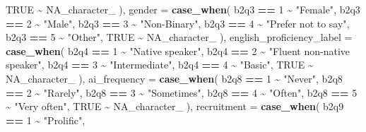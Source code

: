 \documentclass[
]{article}
\newenvironment{Shaded}{\begin{snugshade}}{\end{snugshade}}
\newcommand{\AttributeTok}[1]{\textcolor[rgb]{0.13,0.29,0.53}{#1}}
\newcommand{\ConstantTok}[1]{\textcolor[rgb]{0.56,0.35,0.01}{#1}}
\newcommand{\DecValTok}[1]{\textcolor[rgb]{0.00,0.00,0.81}{#1}}
\newcommand{\FunctionTok}[1]{\textcolor[rgb]{0.13,0.29,0.53}{\textbf{#1}}}
\newcommand{\NormalTok}[1]{#1}
\newcommand{\SpecialCharTok}[1]{\textcolor[rgb]{0.81,0.36,0.00}{\textbf{#1}}}
\newcommand{\StringTok}[1]{\textcolor[rgb]{0.31,0.60,0.02}{#1}}
\begin{document}
\begin{Shaded}
\begin{Highlighting}[]
      \ConstantTok{TRUE} \SpecialCharTok{\textasciitilde{}} \ConstantTok{NA\_character\_}
\NormalTok{    ),}
    \AttributeTok{gender =} \FunctionTok{case\_when}\NormalTok{(}
\NormalTok{      b2q3 }\SpecialCharTok{==} \DecValTok{1} \SpecialCharTok{\textasciitilde{}} \StringTok{"Female"}\NormalTok{,}
\NormalTok{      b2q3 }\SpecialCharTok{==} \DecValTok{2} \SpecialCharTok{\textasciitilde{}} \StringTok{"Male"}\NormalTok{,}
\NormalTok{      b2q3 }\SpecialCharTok{==} \DecValTok{3} \SpecialCharTok{\textasciitilde{}} \StringTok{"Non{-}Binary"}\NormalTok{,}
\NormalTok{      b2q3 }\SpecialCharTok{==} \DecValTok{4} \SpecialCharTok{\textasciitilde{}} \StringTok{"Prefer not to say"}\NormalTok{,}
\NormalTok{      b2q3 }\SpecialCharTok{==} \DecValTok{5} \SpecialCharTok{\textasciitilde{}} \StringTok{"Other"}\NormalTok{,}
      \ConstantTok{TRUE} \SpecialCharTok{\textasciitilde{}} \ConstantTok{NA\_character\_}
\NormalTok{    ),}
    \AttributeTok{english\_proficiency\_label =} \FunctionTok{case\_when}\NormalTok{(}
\NormalTok{      b2q4 }\SpecialCharTok{==} \DecValTok{1} \SpecialCharTok{\textasciitilde{}} \StringTok{"Native speaker"}\NormalTok{,}
\NormalTok{      b2q4 }\SpecialCharTok{==} \DecValTok{2} \SpecialCharTok{\textasciitilde{}} \StringTok{"Fluent non{-}native speaker"}\NormalTok{,}
\NormalTok{      b2q4 }\SpecialCharTok{==} \DecValTok{3} \SpecialCharTok{\textasciitilde{}} \StringTok{"Intermediate"}\NormalTok{,}
\NormalTok{      b2q4 }\SpecialCharTok{==} \DecValTok{4} \SpecialCharTok{\textasciitilde{}} \StringTok{"Basic"}\NormalTok{,}
      \ConstantTok{TRUE} \SpecialCharTok{\textasciitilde{}} \ConstantTok{NA\_character\_}
\NormalTok{    ),}
    \AttributeTok{ai\_frequency =} \FunctionTok{case\_when}\NormalTok{(}
\NormalTok{      b2q8 }\SpecialCharTok{==} \DecValTok{1} \SpecialCharTok{\textasciitilde{}} \StringTok{"Never"}\NormalTok{,}
\NormalTok{      b2q8 }\SpecialCharTok{==} \DecValTok{2} \SpecialCharTok{\textasciitilde{}} \StringTok{"Rarely"}\NormalTok{,}
\NormalTok{      b2q8 }\SpecialCharTok{==} \DecValTok{3} \SpecialCharTok{\textasciitilde{}} \StringTok{"Sometimes"}\NormalTok{,}
\NormalTok{      b2q8 }\SpecialCharTok{==} \DecValTok{4} \SpecialCharTok{\textasciitilde{}} \StringTok{"Often"}\NormalTok{,}
\NormalTok{      b2q8 }\SpecialCharTok{==} \DecValTok{5} \SpecialCharTok{\textasciitilde{}} \StringTok{"Very often"}\NormalTok{,}
      \ConstantTok{TRUE} \SpecialCharTok{\textasciitilde{}} \ConstantTok{NA\_character\_}
\NormalTok{    ),}
    \AttributeTok{recruitment =} \FunctionTok{case\_when}\NormalTok{(}
\NormalTok{      b2q9 }\SpecialCharTok{==} \DecValTok{1} \SpecialCharTok{\textasciitilde{}} \StringTok{"Prolific"}\NormalTok{,}

\end{Highlighting}
\end{Shaded}
\end{document}
